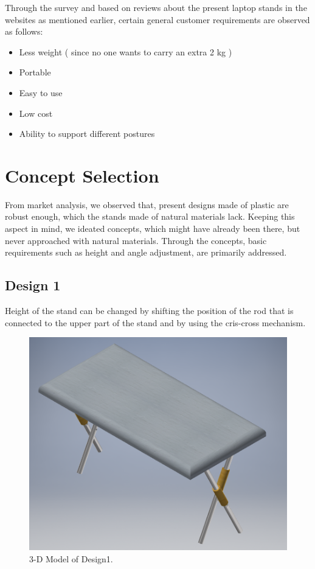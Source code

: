  Through the survey and based on reviews about the present laptop stands in the websites as mentioned earlier, certain general customer requirements are observed as follows:
 
 \begin{itemize}
 \item Less weight ( since no one wants to carry an extra 2 kg )
 \item Portable
 \item Easy to use
 \item Low cost
 \item Ability to support different postures
 \end{itemize}

\chapter{Concept Selection}

From market analysis, we observed that, present designs made of plastic are robust enough, which the stands made of natural materials lack. Keeping this aspect in mind, we ideated concepts, which might have already been there, but never approached with natural materials. Through the concepts, basic requirements such as height and angle adjustment, are primarily addressed.

\section{Design 1}

Height of the stand can be changed by shifting the position of the rod that is connected to the upper part of the stand and by using the cris-cross mechanism. 

\begin{figure}
  \includegraphics[width=\linewidth]{design1}
  \caption{3-D Model of Design1.}
  \label{fig:Design1}
\end{figure}


